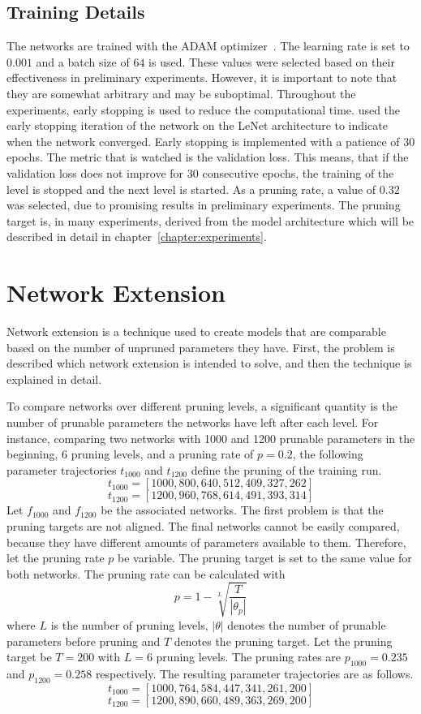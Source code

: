 \subsection{Training Details}
The networks are trained with the ADAM optimizer~\autocite{ADAM}.
The learning rate is set to $0.001$ and a batch size of $64$ is used.
These values were selected based on their effectiveness in preliminary experiments. 
However, it is important to note that they are somewhat arbitrary and may be suboptimal.
Throughout the experiments, early stopping is used to reduce the computational time.
\textcite{LTH} used the early stopping iteration of the network on the LeNet architecture to indicate when the network converged.
Early stopping is implemented with a patience of $30$ epochs.
The metric that is watched is the validation loss.
This means, that if the validation loss does not improve for $30$ consecutive epochs, the training of the level is stopped and the next level is started.
As a pruning rate, a value of $0.32$ was selected, due to promising results in preliminary experiments.
The pruning target is, in many experiments, derived from the model architecture which will be described in detail in chapter~\ref{chapter:experiments}.

\section{Network Extension}\label{sec:extension}
Network extension is a technique used to create models that are comparable based on the number of unpruned parameters they have. 
First, the problem is described which network extension is intended to solve, and then the technique is explained in detail.

To compare networks over different pruning levels, a significant quantity is the number of prunable parameters the networks have left after each level.
For instance, comparing two networks with 1000 and 1200 prunable parameters in the beginning, 6 pruning levels, and a pruning rate of $p=0.2$, the following parameter trajectories $t_{1000}$ and $t_{1200}$ define the pruning of the training run.
\[ t_{1000} = [1000, 800, 640, 512, 409, 327, 262] \]
\[ t_{1200} = [1200, 960, 768, 614, 491, 393, 314] \]
Let $f_{1000}$ and $f_{1200}$ be the associated networks.
The first problem is that the pruning targets are not aligned.
The final networks cannot be easily compared, because they have different amounts of parameters available to them.
Therefore, let the pruning rate $p$ be variable.
The pruning target is set to the same value for both networks.
The pruning rate can be calculated with 
\[ p = 1 - \sqrt[L]{\frac{T}{|\theta_p|}} \]
where $L$ is the number of pruning levels, $|\theta|$ denotes the number of prunable parameters before pruning and $T$ denotes the pruning target.
Let the pruning target be $T=200$ with $L=6$ pruning levels.
The pruning rates are $p_{1000} = 0.235$ and $p_{1200} = 0.258$ respectively.
The resulting parameter trajectories are as follows.
\[ t_{1000} = [1000, 764, 584, 447, 341, 261, 200] \]
\[ t_{1200} = [1200, 890, 660, 489, 363, 269, 200] \]

